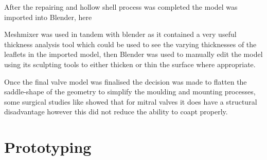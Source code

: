 After the repairing and hollow shell process was completed the model was imported into Blender, here

Meshmixer was used in tandem with blender as it contained a very useful thickness analysis tool which could be used to see the varying thicknesses of the leaflets in the imported model, then Blender was used to manually edit the model using its sculpting tools to either thicken or thin the surface where appropriate.





Once the final valve model was finalised the decision was made to flatten the saddle-shape of the geometry to simplify the moulding and mounting processes, some surgical studies like  showed that for mitral valves it does have a structural disadvantage however this did not reduce the ability to coapt properly.







\section{Prototyping}
